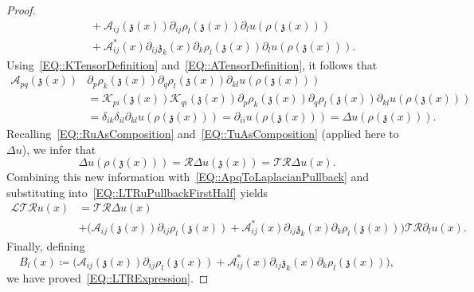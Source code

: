 \documentclass[12pt,a4paper]{amsart}
\numberwithin{equation}{section}
\theoremstyle{definition}
\theoremstyle{remark}
\begin{document}
\begin{proof}
\begin{equation}
\begin{split}
                &\qquad + \mathcal{A}_{ij}(\mathfrak{z}(x))\partial_{ij}\rho_l(\mathfrak{z}(x))\partial_l u(\rho(\mathfrak{z}(x)))\\
                &\qquad + \mathcal{A}_{ij}^\ast(x)\partial_{ij}\mathfrak{z}_k(x)\partial_k\rho_l(\mathfrak{z}(x))\partial_l u(\rho(\mathfrak{z}(x))).
        \end{split}
    \end{equation}
    Using~\eqref{EQ::KTensorDefinition} and~\eqref{EQ::ATensorDefinition}, it follows that
    \begin{equation}\label{EQ::ApqToLaplacianPullback}
        \begin{split}
           \mathcal{A}_{pq}(\mathfrak{z}(x))&\partial_p\rho_k(\mathfrak{z}(x))\partial_q\rho_l(\mathfrak{z}(x))\partial_{kl}u(\rho(\mathfrak{z}(x)))\\
                &= \mathcal{K}_{pi}(\mathfrak{z}(x))\mathcal{K}_{qi}(\mathfrak{z}(x))\partial_p\rho_k(\mathfrak{z}(x))\partial_q\rho_l(\mathfrak{z}(x))\partial_{kl}u(\rho(\mathfrak{z}(x)))\\
                &= \delta_{ik}\delta_{il}\partial_{kl}u(\rho(\mathfrak{z}(x))) = \partial_{ii}u(\rho(\mathfrak{z}(x))) = \Delta u(\rho(\mathfrak{z}(x))).
        \end{split}
    \end{equation}
    Recalling~\eqref{EQ::RuAsComposition} and~\eqref{EQ::TuAsComposition} (applied here to~$\Delta u$), we infer that
    \[\Delta u(\rho(\mathfrak{z}(x))) = \mathcal{R}\Delta u(\mathfrak{z}(x)) = \mathcal{T}\mathcal{R}\Delta u(x).\]
    Combining this new information with~\eqref{EQ::ApqToLaplacianPullback} and substituting into~\eqref{EQ::LTRuPullbackFirstHalf} yields
    \begin{align}
        \mathcal{L}\mathcal{T}\mathcal{R}u(x) &= \mathcal{T}\mathcal{R}\Delta u(x)\\
            &+\bigg(\mathcal{A}_{ij}(\mathfrak{z}(x))\partial_{ij}\rho_l(\mathfrak{z}(x)) + \mathcal{A}_{ij}^\ast(x)\partial_{ij}\mathfrak{z}_k(x)\partial_k\rho_l(\mathfrak{z}(x))\bigg)\mathcal{T}\mathcal{R}\partial_l u(x).
    \end{align}
    Finally, defining
    \begin{equation}
        B_l(x) \coloneq \bigg(\mathcal{A}_{ij}(\mathfrak{z}(x))\partial_{ij}\rho_l(\mathfrak{z}(x)) + \mathcal{A}_{ij}^\ast(x)\partial_{ij}\mathfrak{z}_k(x)\partial_k\rho_l(\mathfrak{z}(x))\bigg),
    \end{equation}
    we have proved~\eqref{EQ::LTRExpression}.


\end{proof}
\end{document}
